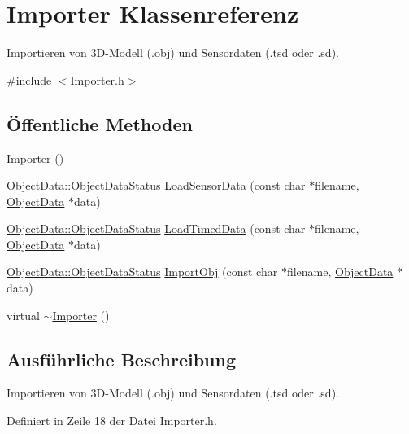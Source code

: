 \hypertarget{classImporter}{\section{Importer Klassenreferenz}
\label{classImporter}
}


Importieren von 3\-D-\/\-Modell (.obj) und Sensordaten (.tsd oder .sd).  




{\ttfamily \#include $<$Importer.\-h$>$}

\subsection*{Öffentliche Methoden}
\begin{DoxyCompactItemize}
\item 
\hyperlink{classImporter_afaf93b56e3558a92405ab627ab8ee1d1}{Importer} ()
\item 
\hyperlink{classObjectData_a20e8cd3cd0f8af3b571b9393aa9e6484}{Object\-Data\-::\-Object\-Data\-Status} \hyperlink{classImporter_a001bd26372d94f96de66f7bcb90cc790}{Load\-Sensor\-Data} (const char $\ast$filename, \hyperlink{classObjectData}{Object\-Data} $\ast$data)
\item 
\hyperlink{classObjectData_a20e8cd3cd0f8af3b571b9393aa9e6484}{Object\-Data\-::\-Object\-Data\-Status} \hyperlink{classImporter_a196e66a161a0102194580ec4b10895e5}{Load\-Timed\-Data} (const char $\ast$filename, \hyperlink{classObjectData}{Object\-Data} $\ast$data)
\item 
\hyperlink{classObjectData_a20e8cd3cd0f8af3b571b9393aa9e6484}{Object\-Data\-::\-Object\-Data\-Status} \hyperlink{classImporter_a5013417fb7556dce65dba1ed3aec4e50}{Import\-Obj} (const char $\ast$filename, \hyperlink{classObjectData}{Object\-Data} $\ast$data)
\item 
virtual \hyperlink{classImporter_a6e61faae5020f2dc034ff3ea4032a537}{$\sim$\-Importer} ()
\end{DoxyCompactItemize}


\subsection{Ausführliche Beschreibung}
Importieren von 3\-D-\/\-Modell (.obj) und Sensordaten (.tsd oder .sd). 

Definiert in Zeile 18 der Datei Importer.\-h.




